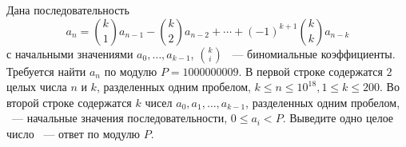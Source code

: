 Дана последовательность
$$
a_n = \binom{k}{1} a_{n-1} - \binom{k}{2} a_{n-2} + \cdots
+ (-1)^{k+1}\binom{k}{k} a_{n-k}
$$
с начальными значениями $a_0, \ldots, a_{k - 1}$,
$\binom{k}{i}$ ~--- биномиальные коэффициенты. Требуется найти
$a_n$ по модулю $P = 1000000009$.
\InputFile
В первой строке содержатся $2$ целых числа $n$ и $k$, разделенных
одним пробелом, $k \le n \le 10^{18}, 1 \le k \le 200$.
Во второй строке содержатся $k$ чисел $a_0, a_1, \ldots, a_{k-1}$,
разделенных одним пробелом, ~--- начальные значения последовательности,
$0 \le a_i < P$.
\OutputFile
Выведите одно целое число ~--- ответ по модулю $P$.

